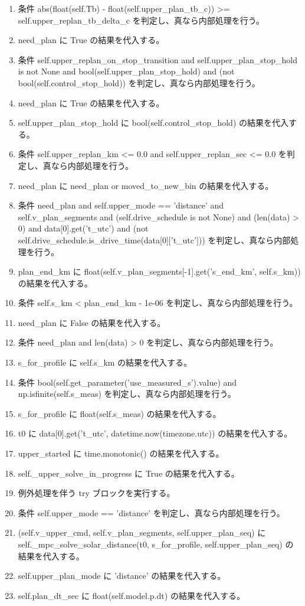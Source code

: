 \documentclass[a4paper,11pt]{article}
\begin{document}
\begin{enumerate}[leftmargin=1.8em]
\item   条件 abs(float(self.Tb) - float(self.upper\_plan\_tb\_c)) >= self.upper\_replan\_tb\_delta\_c を判定し、真なら内部処理を行う。
\item     need\_plan に True の結果を代入する。
\item 条件 self.upper\_replan\_on\_stop\_transition and self.upper\_plan\_stop\_hold is not None and bool(self.upper\_plan\_stop\_hold) and (not bool(self.control\_stop\_hold)) を判定し、真なら内部処理を行う。
\item   need\_plan に True の結果を代入する。
\item self.upper\_plan\_stop\_hold に bool(self.control\_stop\_hold) の結果を代入する。
\item 条件 self.upper\_replan\_km <= 0.0 and self.upper\_replan\_sec <= 0.0 を判定し、真なら内部処理を行う。
\item   need\_plan に need\_plan or moved\_to\_new\_bin の結果を代入する。
\item 条件 need\_plan and self.upper\_mode == 'distance' and self.v\_plan\_segments and (self.drive\_schedule is not None) and (len(data) > 0) and data[0].get('t\_utc') and (not self.drive\_schedule.is\_drive\_time(data[0]['t\_utc'])) を判定し、真なら内部処理を行う。
\item   plan\_end\_km に float(self.v\_plan\_segments[-1].get('s\_end\_km', self.s\_km)) の結果を代入する。
\item   条件 self.s\_km < plan\_end\_km - 1e-06 を判定し、真なら内部処理を行う。
\item     need\_plan に False の結果を代入する。
\item 条件 need\_plan and len(data) > 0 を判定し、真なら内部処理を行う。
\item   s\_for\_profile に self.s\_km の結果を代入する。
\item   条件 bool(self.get\_parameter('use\_measured\_s').value) and np.isfinite(self.s\_meas) を判定し、真なら内部処理を行う。
\item     s\_for\_profile に float(self.s\_meas) の結果を代入する。
\item   t0 に data[0].get('t\_utc', datetime.now(timezone.utc)) の結果を代入する。
\item   upper\_started に time.monotonic() の結果を代入する。
\item   self.\_upper\_solve\_in\_progress に True の結果を代入する。
\item   例外処理を伴う try ブロックを実行する。
\item     条件 self.upper\_mode == 'distance' を判定し、真なら内部処理を行う。
\item       (self.v\_upper\_cmd, self.v\_plan\_segments, self.upper\_plan\_seq) に self.\_mpc\_solve\_solar\_distance(t0, s\_for\_profile, self.upper\_plan\_seq) の結果を代入する。
\item       self.upper\_plan\_mode に 'distance' の結果を代入する。
\item       self.plan\_dt\_sec に float(self.model.p.dt) の結果を代入する。
            \end{enumerate}
\end{document}
